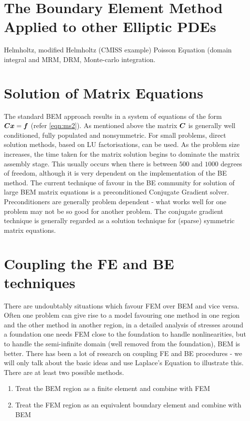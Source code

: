 \section{The Boundary Element Method Applied to other Elliptic PDEs}

Helmholtz, modified Helmholtz (CMISS example) Poisson Equation (domain
integral and MRM, DRM, Monte-carlo integration.


\section{Solution of Matrix Equations}

The standard BEM approach results in a system of equations of the form
 $\matr{C}\vectr{x} = \vectr{f}$ (refer \eqref{eqn:ms2}).  As mentioned above the
matrix $\matr{C}$ is generally well conditioned, fully populated and
nonsymmetric.  For small problems, direct solution methods, based on LU
factorisations, can be used.  As the problem size increases, the time taken for
the matrix solution begins to dominate the matrix assembly stage.  This
usually occurs when there is between $500$ and $1000$ degrees of freedom, although
it is very dependent on the implementation of the BE method.  The current
technique of favour in the BE community for solution of large BEM matrix
equations is a preconditioned Conjugate Gradient solver. Preconditioners are
generally problem dependent - what works well for one problem may not be so
good for another problem.  The conjugate gradient technique is generally
regarded as a solution technique for (sparse) symmetric matrix equations. 


\section{Coupling the FE and BE techniques}

There are undoubtably situations which favour FEM over BEM and vice versa.
Often one problem can give rise to a model favouring one method in one region
and the other method in another region, \eg in a detailed analysis of stresses
around a foundation one needs FEM close to the foundation to handle
nonlinearities, but to handle the semi-infinite domain (well removed from the
foundation), BEM is better.  There has been a lot of research on coupling FE
and BE procedures - we will only talk about the basic ideas and use Laplace's
Equation to illustrate this.  There are at least two possible methods.  
\begin{enumerate}
\item Treat the BEM region as a finite element and combine with FEM
\item Treat the FEM region as an equivalent boundary element and combine with
  BEM
\end{enumerate}

